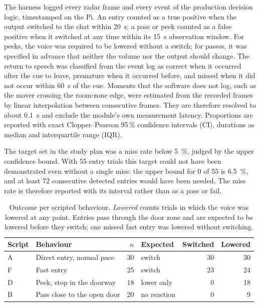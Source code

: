 The harness logged every radar frame and every event of the production
decision logic, timestamped on the Pi. An entry counted as a true positive
when the output switched to the chat within \SI{20}{\second}; a pass or peek
counted as a false positive when it switched at any time within its
\SI{15}{\second} observation window. For peeks, the voice was required to be
lowered without a switch; for passes, it was specified in advance that neither
the volume nor the output should change. The return to speech was classified
from the event log as correct when it occurred after the cue to leave,
premature when it occurred before, and missed when it did not occur within
\SI{60}{\second} of the cue. Moments that the software does not log, such as
the mover crossing the room-zone edge, were estimated from the recorded frames
by linear interpolation between consecutive frames. They are therefore resolved
to about \SI{0.1}{\second} and exclude the module's own measurement latency.
Proportions are reported with exact Clopper--Pearson 95\,\% confidence
intervals (CI), durations as median and interquartile range (IQR).

The target set in the study plan was a miss rate below \SI{5}{\percent},
judged by the upper confidence bound. With 55 entry trials this target could
not have been demonstrated even without a single miss: the upper bound for 0 of
55 is \SI{6.5}{\percent}, and at least 72 consecutive detected entries would
have been needed. The miss rate is therefore reported with its interval rather
than as a pass or fail.

\begin{table}[htbp]
  \centering
  \caption{Outcome per scripted behaviour. \emph{Lowered} counts trials in
  which the voice was lowered at any point. Entries pass through the door zone
  and are expected to be lowered before they switch; one missed fast entry was
  lowered without switching.}
  \label{tab:ps-outcomes}
  \begin{tabular}{llrlrr}
    \toprule
    Script & Behaviour & $n$ & Expected & Switched & Lowered \\
    \midrule
    A & Direct entry, normal pace   & 30 & switch      & 30 & 30 \\
    F & Fast entry                  & 25 & switch      & 23 & 24 \\
    D & Peek, stop in the doorway   & 18 & lower only  &  0 & 18 \\
    B & Pass close to the open door & 20 & no reaction &  0 &  9 \\
    \bottomrule
  \end{tabular}
\end{table}

